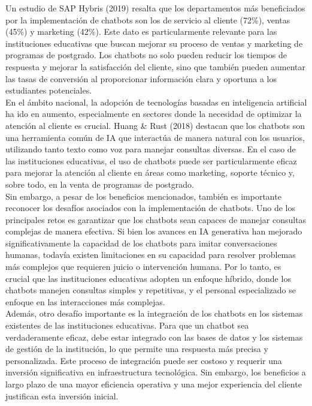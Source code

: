 \documentclass[10pt,a4paper]{article}
\begin{document}
Un estudio de SAP Hybris (2019) resalta que los departamentos más beneficiados por la implementación de chatbots son los de servicio al cliente (72\%), ventas (45\%) y marketing (42\%). Este dato es particularmente relevante para las instituciones educativas que buscan mejorar su proceso de ventas y marketing de programas de postgrado. Los chatbots no solo pueden reducir los tiempos de respuesta y mejorar la satisfacción del cliente, sino que también pueden aumentar las tasas de conversión al proporcionar información clara y oportuna a los estudiantes potenciales.\\

En el ámbito nacional, la adopción de tecnologías basadas en inteligencia artificial ha ido en aumento, especialmente en sectores donde la necesidad de optimizar la atención al cliente es crucial. Huang \& Rust (2018) destacan que los chatbots son una herramienta común de IA que interactúa de manera natural con los usuarios, utilizando tanto texto como voz para manejar consultas diversas. En el caso de las instituciones educativas, el uso de chatbots puede ser particularmente eficaz para mejorar la atención al cliente en áreas como marketing, soporte técnico y, sobre todo, en la venta de programas de postgrado.\\

Sin embargo, a pesar de los beneficios mencionados, también es importante reconocer los desafíos asociados con la implementación de chatbots. Uno de los principales retos es garantizar que los chatbots sean capaces de manejar consultas complejas de manera efectiva. Si bien los avances en IA generativa han mejorado significativamente la capacidad de los chatbots para imitar conversaciones humanas, todavía existen limitaciones en su capacidad para resolver problemas más complejos que requieren juicio o intervención humana. Por lo tanto, es crucial que las instituciones educativas adopten un enfoque híbrido, donde los chatbots manejen consultas simples y repetitivas, y el personal especializado se enfoque en las interacciones más complejas.\\

Además, otro desafío importante es la integración de los chatbots en los sistemas existentes de las instituciones educativas. Para que un chatbot sea verdaderamente eficaz, debe estar integrado con las bases de datos y los sistemas de gestión de la institución, lo que permite una respuesta más precisa y personalizada. Este proceso de integración puede ser costoso y requerir una inversión significativa en infraestructura tecnológica. Sin embargo, los beneficios a largo plazo de una mayor eficiencia operativa y una mejor experiencia del cliente justifican esta inversión inicial.\\
\end{document}
